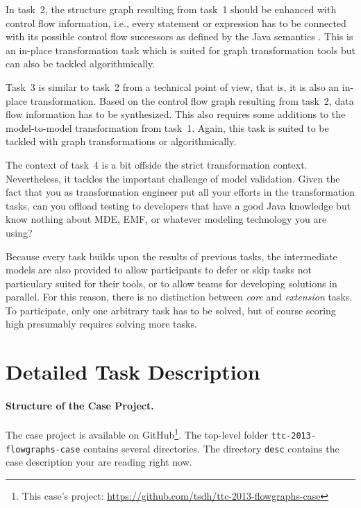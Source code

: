 \documentclass[11pt]{article}
\begin{document}
In task~2, the structure graph resulting from task~1 should be enhanced with
control flow information, i.e., every statement or expression has to be
connected with its possible control flow successors as defined by the Java
semantics \cite{Java7Spec}.  This is an in-place transformation task which is
suited for graph transformation tools but can also be tackled algorithmically.

Task~3 is similar to task~2 from a technical point of view, that is, it is also
an in-place transformation.  Based on the control flow graph resulting from
task~2, data flow information has to be synthesized.  This also requires some
additions to the model-to-model transformation from task~1.  Again, this task
is suited to be tackled with graph transformations or algorithmically.

The context of task~4 is a bit offside the strict transformation context.
Nevertheless, it tackles the important challenge of model validation.  Given
the fact that you as transformation engineer put all your efforts in the
transformation tasks, can you offload testing to developers that have a good
Java knowledge but know nothing about MDE, EMF, or whatever modeling technology
you are using?

Because every task builds upon the results of previous tasks, the intermediate
models are also provided to allow participants to defer or skip tasks not
particulary suited for their tools, or to allow teams for developing solutions
in parallel.  For this reason, there is no distinction between \emph{core} and
\emph{extension} tasks.  To participate, only one arbitrary task has to be
solved, but of course scoring high presumably requires solving more tasks.


\section{Detailed Task Description}
\label{sec:task-descr}

\paragraph{Structure of the Case Project.}

The case project is available on GitHub\footnote{This case's project:
  \url{https://github.com/tsdh/ttc-2013-flowgraphs-case}}. The top-level folder
\verb|ttc-2013-flowgraphs-case| contains several directories.  The directory
\verb|desc| contains the case description your are reading right now.
\end{document}

